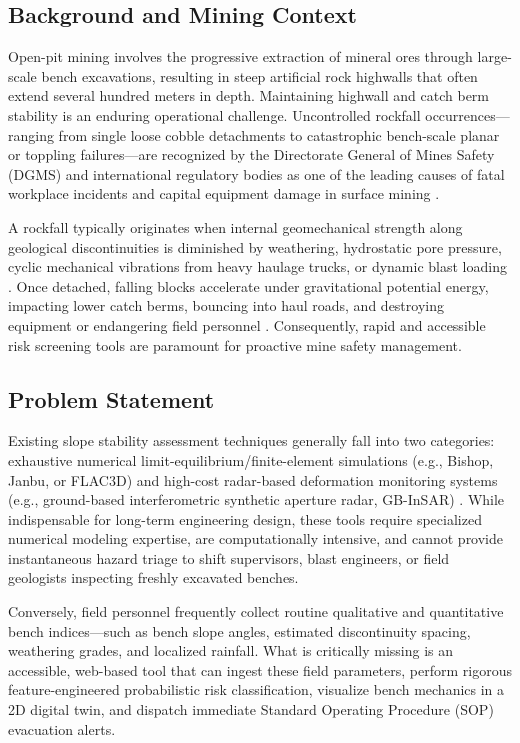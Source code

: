 \documentclass[conference]{IEEEtran}
\begin{document}
\subsection{Background and Mining Context}
Open-pit mining involves the progressive extraction of mineral ores through large-scale bench excavations, resulting in steep artificial rock highwalls that often extend several hundred meters in depth. Maintaining highwall and catch berm stability is an enduring operational challenge. Uncontrolled rockfall occurrences—ranging from single loose cobble detachments to catastrophic bench-scale planar or toppling failures—are recognized by the Directorate General of Mines Safety (DGMS) and international regulatory bodies as one of the leading causes of fatal workplace incidents and capital equipment damage in surface mining \cite{hoek1981rock, wyllie2004rock}. 

A rockfall typically originates when internal geomechanical strength along geological discontinuities is diminished by weathering, hydrostatic pore pressure, cyclic mechanical vibrations from heavy haulage trucks, or dynamic blast loading \cite{bieniawski1989engineering}. Once detached, falling blocks accelerate under gravitational potential energy, impacting lower catch berms, bouncing into haul roads, and destroying equipment or endangering field personnel \cite{ritchie1963evaluation}. Consequently, rapid and accessible risk screening tools are paramount for proactive mine safety management.

\subsection{Problem Statement}
Existing slope stability assessment techniques generally fall into two categories: exhaustive numerical limit-equilibrium/finite-element simulations (e.g., Bishop, Janbu, or FLAC3D) and high-cost radar-based deformation monitoring systems (e.g., ground-based interferometric synthetic aperture radar, GB-InSAR) \cite{eberhardt2004numerical, mazzanti2012ground}. While indispensable for long-term engineering design, these tools require specialized numerical modeling expertise, are computationally intensive, and cannot provide instantaneous hazard triage to shift supervisors, blast engineers, or field geologists inspecting freshly excavated benches.

Conversely, field personnel frequently collect routine qualitative and quantitative bench indices—such as bench slope angles, estimated discontinuity spacing, weathering grades, and localized rainfall. What is critically missing is an accessible, web-based tool that can ingest these field parameters, perform rigorous feature-engineered probabilistic risk classification, visualize bench mechanics in a 2D digital twin, and dispatch immediate Standard Operating Procedure (SOP) evacuation alerts.
\end{document}

